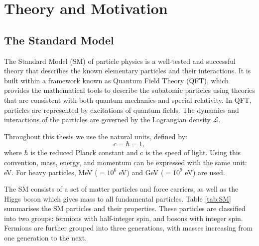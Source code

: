 \documentclass[thesis.tex]{subfiles}
\begin{document}
\chapter{Theory and Motivation}
\label{ch1}

\section{The Standard Model}
The Standard Model (SM) of particle physics is a well-tested and successful theory that describes the known elementary particles and their interactions. 
It is built within a framework known as Quantum Field Theory (QFT), which provides the mathematical tools to describe the subatomic particles using theories that are consistent with both quantum mechanics and special relativity. 
In QFT, particles are represented by excitations of quantum fields. 
The dynamics and interactions of the particles are governed by the Lagrangian density $\mathcal{L}$.

Throughout this thesis we use the natural units, defined by:
\begin{equation}
	c = \hbar = 1,
\end{equation}
where $\hbar$ is the reduced Planck constant and c is the speed of light. 
Using this convention, mass, energy, and momentum can be expressed with the same unit: eV.
For heavy particles, MeV ($=10^6$ eV) and GeV ($=10^9$ eV) are used.

The SM consists of a set of matter particles and force carriers, as well as the Higgs boson which gives mass to all fundamental particles. 
Table \ref{tab:SM} summarises the SM particles and their properties.
These particles are classified into two groups: fermions with half-integer spin, and bosons with integer spin.
Fermions are further grouped into three generations, with masses increasing from one generation to the next. 
\end{document}
